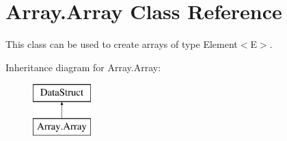 \hypertarget{class_array_1_1_array}{}\section{Array.\+Array Class Reference}
\label{class_array_1_1_array}


This class can be used to create arrays of type Element$<$\+E$>$.  


Inheritance diagram for Array.\+Array\+:\begin{figure}[H]
\begin{center}
\leavevmode
\includegraphics[height=2.000000cm]{class_array_1_1_array}
\end{center}
\end{figure}
